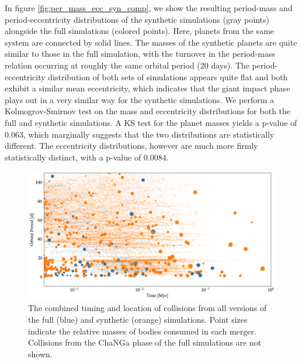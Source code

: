 
In figure \ref{fig:per_mass_ecc_syn_comp}, we show the resulting period-mass and period-eccentricity distributions of the synthetic simulations (gray points) alongside the full simulations (colored points). Here, planets from the same system are connected by solid lines. The masses of the synthetic planets are quite similar to those in the full simulation, with the turnover in the period-mass relation occurring at roughly the same orbital period (20 days). The period-eccentricity distribution of both sets of simulations appears quite flat and both exhibit a similar mean eccentricity, which indicates that the giant impact phase plays out in a very similar way for the synthetic simulations. We perform a Kolmogrov-Smirnov test on the mass and eccentricity distributions for both the full and synthetic simulations. A KS test for the planet masses yields a p-value of 0.063, which marginally suggests that the two distributions are statistically different. The eccentricity distributions, however are much more firmly statistically distinct, with a p-value of 0.0084.

\begin{figure}
\begin{center}
    \includegraphics[width=\textwidth]{figures/stip/full_coll_syn_comp.png}
    \caption{The combined timing and location of collisions from all versions of the full (blue) and synthetic (orange) simulations. Point sizes indicate the relative masses of bodies consumed in each merger. Collisions from the {\sc ChaNGa} phase of the full simulations are not shown.\label{fig:full_coll_syn_comp}}
\end{center}
\end{figure}

